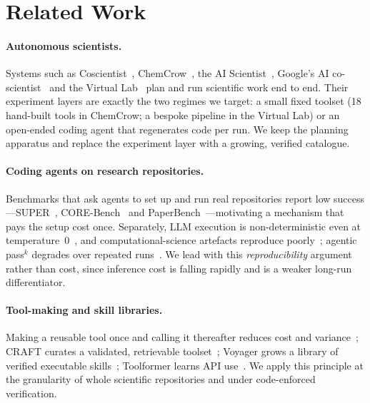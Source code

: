 \section{Related Work}

\paragraph{Autonomous scientists.}
Systems such as Coscientist~\citep{boiko2023coscientist},
ChemCrow~\citep{bran2024chemcrow}, the AI
Scientist~\citep{lu2024aiscientist}, Google's AI
co-scientist~\citep{google2025coscientist} and the Virtual
Lab~\citep{swanson2025virtuallab} plan and run scientific work end to end. Their
experiment layers are exactly the two regimes we target: a small fixed toolset
(18 hand-built tools in ChemCrow; a bespoke pipeline in the Virtual Lab) or an
open-ended coding agent that regenerates code per run. We keep the planning
apparatus and replace the experiment layer with a growing, verified catalogue.

\paragraph{Coding agents on research repositories.}
Benchmarks that ask agents to set up and run real repositories report low
success---SUPER~\citep{super2024}, CORE-Bench~\citep{corebench2024} and
PaperBench~\citep{starace2025paperbench}---motivating a mechanism that pays the
setup cost once. Separately, LLM execution is non-deterministic even at
temperature~0~\citep{he2025nondeterminism}, and computational-science artefacts
reproduce poorly~\citep{pimentel2024notebooks}; agentic pass$^k$ degrades over
repeated runs~\citep{yao2024taubench}. We lead with this
\emph{reproducibility} argument rather than cost, since inference cost is falling
rapidly and is a weaker long-run differentiator.

\paragraph{Tool-making and skill libraries.}
Making a reusable tool once and calling it thereafter reduces cost and
variance~\citep{cai2024latm}; CRAFT curates a validated, retrievable
toolset~\citep{yuan2024craft}; Voyager grows a library of verified executable
skills~\citep{wang2023voyager}; Toolformer learns API use~\citep{schick2023toolformer}.
We apply this principle at the granularity of whole scientific repositories and
under code-enforced verification.

